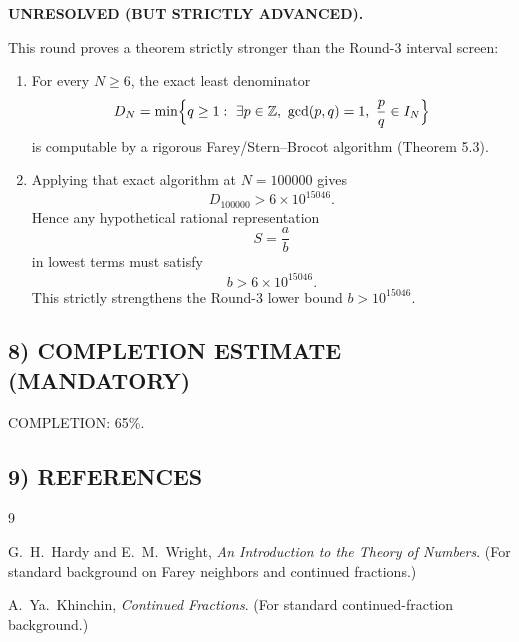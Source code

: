 \textbf{UNRESOLVED (BUT STRICTLY ADVANCED).}

This round proves a theorem strictly stronger than the Round-3 interval screen:

\begin{enumerate}
\item For every $N\ge 6$, the exact least denominator
\[
D_N=\min\Bigl\{q\ge 1:\ \exists p\in\mathbb Z,\ \gcd(p,q)=1,\ \frac pq\in I_N\Bigr\}
\]
is computable by a rigorous Farey/Stern--Brocot algorithm (Theorem 5.3).

\item Applying that exact algorithm at $N=100000$ gives
\[
D_{100000}>6\times 10^{15046}.
\]
Hence any hypothetical rational representation
\[
S=\frac ab
\]
in lowest terms must satisfy
\[
b>6\times 10^{15046}.
\]
This strictly strengthens the Round-3 lower bound $b>10^{15046}$.
\end{enumerate}

\subsection*{8) COMPLETION ESTIMATE (MANDATORY)}

COMPLETION: 65\%.

\subsection*{9) REFERENCES}

\begin{thebibliography}{9}

G.~H.~Hardy and E.~M.~Wright,
\emph{An Introduction to the Theory of Numbers}.
(For standard background on Farey neighbors and continued fractions.)

A.~Ya.~Khinchin,
\emph{Continued Fractions}.
(For standard continued-fraction background.)

\end{thebibliography}
